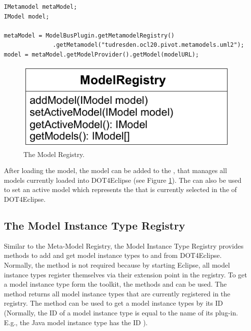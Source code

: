 \lstset{
  language=Java
}
\begin{lstlisting}[caption={How to load a model.}, captionpos=b, label=lst:integration:loadModel, float]
IMetamodel metaModel;
IModel model;

metaModel =	ModelBusPlugin.getMetamodelRegistry()
              .getMetamodel("tudresden.ocl20.pivot.metamodels.uml2");
model = metaModel.getModelProvider().getModel(modelURL);
\end{lstlisting}

\begin{figure}[!b]
	\centering
	\includegraphics[width=.55\linewidth]{figures/integration/modelRegistry}
	\caption{The Model Registry.}
	\label{pic:integration:modelRegistry}
\end{figure}

After loading the model, the model can be added to the , that manages all models currently loaded into \acl{DOT4Eclipse} (see Figure \ref{pic:integration:modelRegistry}). The  can also be used to set an active model which represents the  that is currently selected in the  of \acl{DOT4Eclipse}.


\subsection{The Model Instance Type Registry}

Similar to the Meta-Model Registry, the Model Instance Type Registry provides methods to add and get model instance types to and from \acl{DOT4Eclipse}. Normally, the method  is not required because by starting Eclipse, all model instance types register themselves via their extension point in the registry. To get a model instance type form the toolkit, the methods  and  can be used. The method  returns all model instance types that are currently registered in the registry. The method  can be used to get a model instance types by its ID (Normally, the ID of a model instance type is equal to the name of its plug-in. E.g., the Java model instance type has the ID ).

